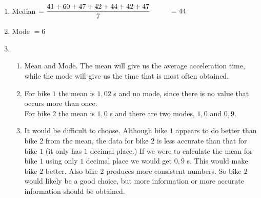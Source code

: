  \begin{eocsolutions}{}{
\begin{enumerate}[itemsep=5pt, label=\textbf{\arabic*}. ] 


\item %
Median $=\dfrac{41+60+47+42+44+42+47}{7} \\
~~~~~~~~=44$
\item %
Mode $=6$
\item %

\begin{enumerate}[noitemsep, label=\textbf{(\alph*)} ]
    \item Mean and Mode. The mean will give us the average acceleration time, while the mode will give us the time that is most often obtained.%
    \item For bike $1$ the mean is $1,02$ s and no mode, since there is no value that occurs more than once.\\
	  For bike $2$ the mean is $1,0$ s and there are two modes, $1,0$ and $0,9$.
    \item It would be difficult to choose. Although bike $1$ appears to do better than bike $2$ from the mean, the data for bike $2$ is less accurate than that for bike $1$ (it only has $1$ decimal place.) If we were to calculate the mean for bike $1$ using only $1$ decimal place we would get $0,9$ s. This would make bike $2$ better. Also bike $2$ produces more consistent numbers. So bike $2$ would likely be a good choice, but more information or more accurate information should be obtained.

    \end{enumerate}


\end{enumerate}}
\end{eocsolutions}
